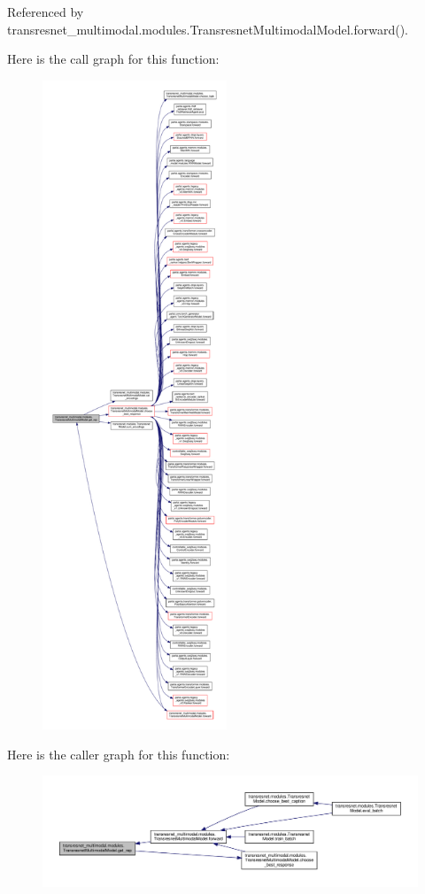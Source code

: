 Referenced by transresnet\+\_\+multimodal.\+modules.\+Transresnet\+Multimodal\+Model.\+forward().

Here is the call graph for this function\+:
\nopagebreak
\begin{figure}[H]
\begin{center}
\leavevmode
\includegraphics[height=550pt]{classtransresnet__multimodal_1_1modules_1_1TransresnetMultimodalModel_a9c07e36d8eb4e3321a61783e7b0931bd_cgraph}
\end{center}
\end{figure}
Here is the caller graph for this function\+:
\nopagebreak
\begin{figure}[H]
\begin{center}
\leavevmode
\includegraphics[width=350pt]{classtransresnet__multimodal_1_1modules_1_1TransresnetMultimodalModel_a9c07e36d8eb4e3321a61783e7b0931bd_icgraph}
\end{center}
\end{figure}


